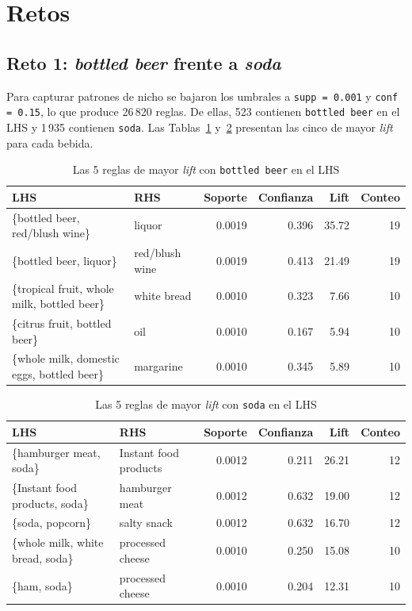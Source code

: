 \documentclass[11pt,a4paper]{article}
\begin{document}
\section{Retos}

\subsection{Reto 1: \emph{bottled beer} frente a \emph{soda}}

Para capturar patrones de nicho se bajaron los umbrales a \texttt{supp = 0.001} y
\texttt{conf = 0.15}, lo que produce 26\,820 reglas. De ellas, 523 contienen
\texttt{bottled beer} en el LHS y 1\,935 contienen \texttt{soda}. Las
Tablas~\ref{tab:beer} y~\ref{tab:soda} presentan las cinco de mayor \emph{lift} para cada
bebida.

\begin{table}[H]
  \centering
  \caption{Las 5 reglas de mayor \emph{lift} con \texttt{bottled beer} en el LHS}
  \label{tab:beer}
  \small
  \begin{tabular}{llrrrr}
    \toprule
    LHS & RHS & Soporte & Confianza & Lift & Conteo \\
    \midrule
    \{bottled beer, red/blush wine\} & liquor & 0.0019 & 0.396 & 35.72 & 19 \\
    \{bottled beer, liquor\} & red/blush wine & 0.0019 & 0.413 & 21.49 & 19 \\
    \{tropical fruit, whole milk, bottled beer\} & white bread & 0.0010 & 0.323 & 7.66 & 10 \\
    \{citrus fruit, bottled beer\} & oil & 0.0010 & 0.167 & 5.94 & 10 \\
    \{whole milk, domestic eggs, bottled beer\} & margarine & 0.0010 & 0.345 & 5.89 & 10 \\
    \bottomrule
  \end{tabular}
\end{table}

\begin{table}[H]
  \centering
  \caption{Las 5 reglas de mayor \emph{lift} con \texttt{soda} en el LHS}
  \label{tab:soda}
  \small
  \begin{tabular}{llrrrr}
    \toprule
    LHS & RHS & Soporte & Confianza & Lift & Conteo \\
    \midrule
    \{hamburger meat, soda\} & Instant food products & 0.0012 & 0.211 & 26.21 & 12 \\
    \{Instant food products, soda\} & hamburger meat & 0.0012 & 0.632 & 19.00 & 12 \\
    \{soda, popcorn\} & salty snack & 0.0012 & 0.632 & 16.70 & 12 \\
    \{whole milk, white bread, soda\} & processed cheese & 0.0010 & 0.250 & 15.08 & 10 \\
    \{ham, soda\} & processed cheese & 0.0010 & 0.204 & 12.31 & 10 \\
    \bottomrule
  \end{tabular}
\end{table}
\end{document}
